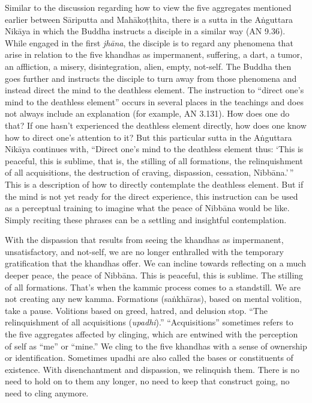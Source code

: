 Similar to the discussion regarding how to view the five aggregates mentioned earlier between Sāriputta and Mahākoṭṭhita, there is a sutta in the Aṅguttara Nikāya in which the Buddha instructs a disciple in a similar way (AN 9.36). While engaged in the first \emph{jhāna}, the disciple is to regard any phenomena that arise in relation to the five khandhas as impermanent, suffering, a dart, a tumor, an affliction, a misery, disintegration, alien, empty, not-self. The Buddha then goes further and instructs the disciple to turn away from those phenomena and instead direct the mind to the deathless element. The instruction to ``direct one's mind to the deathless element'' occurs in several places in the teachings and does not always include an explanation (for example, AN 3.131). How does one do that? If one hasn't experienced the deathless element directly, how does one know how to direct one's attention to it? But this particular sutta in the Aṅguttara Nikāya continues with, ``Direct one's mind to the deathless element thus: `This is peaceful, this is sublime, that is, the stilling of all formations, the relinquishment of all acquisitions, the destruction of craving, dispassion, cessation, Nibbāna.'\,'' This is a description of how to directly contemplate the deathless element. But if the mind is not yet ready for the direct experience, this instruction can be used as a perceptual training to imagine what the peace of Nibbāna would be like. Simply reciting these phrases can be a settling and insightful contemplation.

With the dispassion that results from seeing the khandhas as impermanent, unsatisfactory, and not-self, we are no longer enthralled with the temporary gratification that the khandhas offer. We can incline towards reflecting on a much deeper peace, the peace of Nibbāna. This is peaceful, this is sublime. The stilling of all formations. That's when the kammic process comes to a standstill. We are not creating any new kamma. Formations (saṅkhāras), based on mental volition, take a pause. Volitions based on greed, hatred, and delusion stop. ``The relinquishment of all acquisitions (\emph{upadhi}).'' ``Acquisitions'' sometimes refers to the five aggregates affected by clinging, which are entwined with the perception of self as ``me'' or ``mine.'' We cling to the five khandhas with a sense of ownership or identification. Sometimes upadhi are also called the bases or constituents of existence. With disenchantment and dispassion, we relinquish them. There is no need to hold on to them any longer, no need to keep that construct going, no need to cling anymore.

